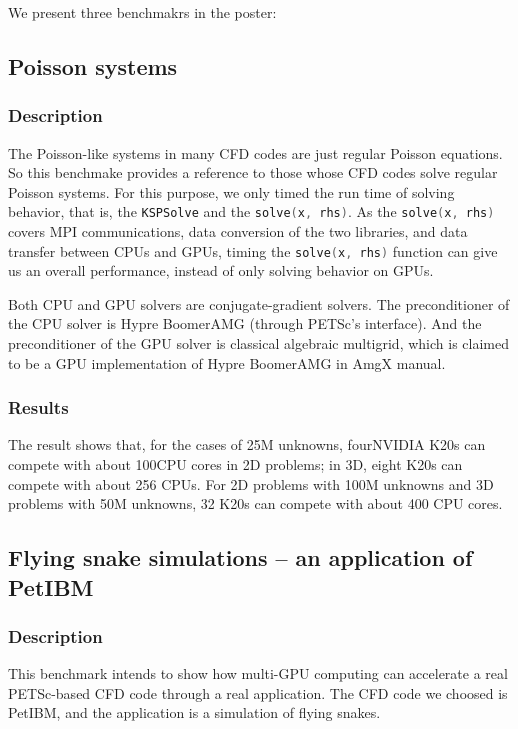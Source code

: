 We present three benchmakrs in the poster:

\subsection{Poisson systems}

    \subsubsection{Description}
    The Poisson-like systems in many CFD codes are just regular Poisson equations.
    So this benchmake provides a reference to those whose CFD codes solve regular Poisson systems.
    For this purpose,
    we only timed the run time of solving behavior, that is, the
    \lstinline[language=C++, basicstyle=\ttfamily]|KSPSolve| and the
    \lstinline[language=C++, basicstyle=\ttfamily]|solve(x, rhs)|.
    As the
    \lstinline[language=C++, basicstyle=\ttfamily]|solve(x, rhs)|
    covers MPI communications, 
    data conversion of the two libraries, 
    and data transfer between CPUs and GPUs,
    timing the
    \lstinline[language=C++, basicstyle=\ttfamily]|solve(x, rhs)| function
    can give us an overall performance, 
    instead of only solving behavior on GPUs.

    Both CPU and GPU solvers are conjugate-gradient solvers.
    The preconditioner of the CPU solver is Hypre BoomerAMG (through PETSc's interface).
    And the preconditioner of the GPU solver is classical algebraic multigrid, 
    which is claimed to be a GPU implementation of Hypre BoomerAMG in AmgX manual\cite[see][p.130]{amgx-manual}.

    \subsubsection{Results}
    The result shows that, for the cases of 25M unknowns,
    four\footnotemark[2] NVIDIA K20s can compete with about 100\footnotemark[3] CPU cores in 2D problems;
    in 3D, eight K20s can compete with about 256 CPUs.
    For 2D problems with 100M unknowns and 3D problems with 50M unknowns,
    32 K20s can compete with about 400 CPU cores.

\subsection{Flying snake simulations -- an application of PetIBM}

    \subsubsection{Description}
    This benchmark intends to show how multi-GPU computing can accelerate
    a real PETSc-based CFD code through a real application.
    The CFD code we choosed is PetIBM\cite{petibm-repo}, 
    and the application is a simulation of flying snakes\cite{Krishnan-2013-ID33}.

